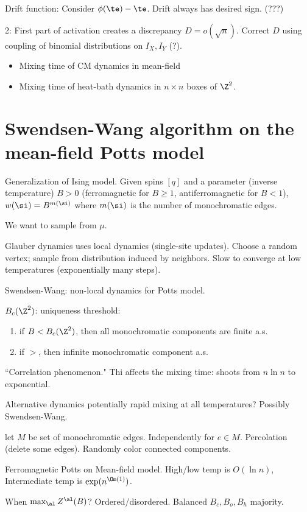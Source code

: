 Drift function: Consider $\phi(\te)-\te$. Drift always has desired sign. (???)

2: First part of activation creates a discrepancy $D=o(\sqrt n)$. Correct $D$ using coupling of binomial distributions on $I_X,I_Y$ (?).

\begin{itemize}
\item
Mixing time of CM dynamics in mean-field
\item
Mixing time of heat-bath dynamics in $n\times n$ boxes of $\Z^2$.
\end{itemize}

\section{Swendsen-Wang algorithm on the mean-field Potts model}

Generalization of Ising model. Given spins $[q]$ and a parameter (inverse temperature) $B>0$ (ferromagnetic for $B\ge 1$, antiferromagnetic for $B<1$), $w(\si)=B^{m(\si)}$ where $m(\si)$ is the number of monochromatic edges.

We want to sample from $\mu$.

Glauber dynamics uses local dynamics (single-site updates).  Choose a random vertex; sample from distribution induced by neighbors. Slow to converge at low temperatures (exponentially many steps).

Swendsen-Wang: non-local dynamics for Potts model.

$B_c(\Z^2)$: uniqueness threshold: 
\begin{enumerate}
\item
if $B<B_c(\Z^2)$, then all monochromatic components are finite a.s.
\item
if $>$, then infinite monochromatic component a.s.
\end{enumerate}
``Correlation phenomenon." Thi affects the mixing time: shoots from $n\ln n$ to exponential.

Alternative dynamics potentially rapid mixing at all temperatures? Possibly Swendsen-Wang.

let $M$ be set of monochromatic edges. Independently for $e\in M$. Percolation (delete some edges). Randomly color connected components.

Ferromagnetic Potts on Mean-field model. High/low temp is $O(\ln n)$, Intermediate temp is $\exp(n^{\Om(1)})$. %

When $\max_\al Z^\al(B)$? Ordered/disordered. Balanced $B_c, B_o, B_h$ majority.

